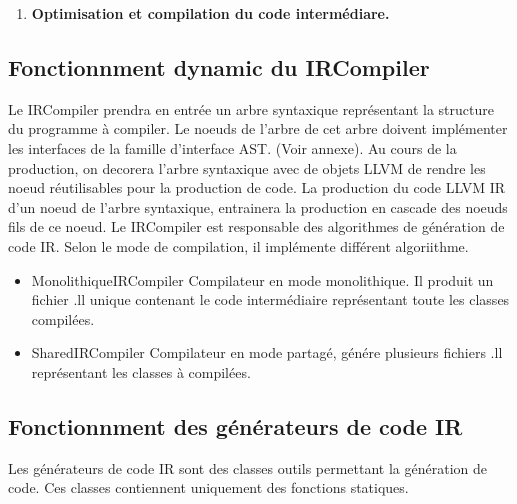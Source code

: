 \documentclass{article}
\begin{document}
\begin{enumerate}
   \item \textbf{Optimisation et compilation du code intermédiare.}

   \end{enumerate}

\subsection{Fonctionnment dynamic du IRCompiler}

Le IRCompiler prendra en entrée un arbre syntaxique représentant la structure du programme à compiler.
Le noeuds de l'arbre de cet arbre doivent implémenter les interfaces de la famille d'interface AST. (Voir annexe).
Au cours de la production, on decorera l'arbre syntaxique avec de objets LLVM de rendre les noeud réutilisables
pour la production de code. La production du code LLVM IR d'un noeud de l'arbre syntaxique, entrainera la production en cascade des noeuds fils de ce noeud. Le IRCompiler est responsable des algorithmes de génération de code IR. Selon le mode de compilation,
il implémente différent algoriithme. \\
 \begin{itemize}
	\item MonolithiqueIRCompiler Compilateur en mode monolithique. Il produit un fichier .ll unique contenant le code intermédiaire 
	représentant toute les classes compilées. 
	\item SharedIRCompiler Compilateur en mode partagé, génére plusieurs fichiers .ll représentant les classes à compilées.
	\end{itemize}

\subsection{Fonctionnment des générateurs de code IR}

   Les générateurs de code IR sont des classes outils permettant la génération de code. Ces classes contiennent uniquement des fonctions statiques.
\end{document}
